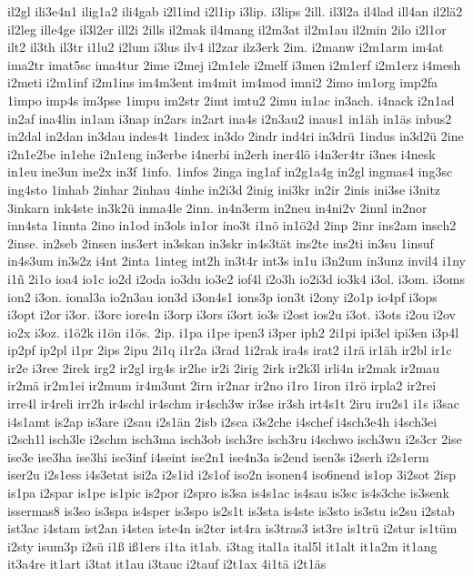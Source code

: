 {il2gl
ili3e4n1
ilig1a2
ili4gab
i2l1ind
i2l1ip
i3lip.
i3lips
2ill.
il3l2a
il4lad
ill4an
il2lä2
il2leg
ille4ge
il3l2er
ill2i
2ills
il2mak
il4mang
il2m3at
il2m1au
il2min
2ilo
i2l1or
ilt2
il3th
il3tr
i1lu2
i2lum
i3lus
ilv4
il2zar
ilz3erk
2im.
i2manw
i2m1arm
im4at
ima2tr
imat5sc
ima4tur
2ime
i2mej
i2m1ele
i2melf
i3men
i2m1erf
i2m1erz
i4mesh
i2meti
i2m1inf
i2m1ins
im4m3ent
im4mit
im4mod
imni2
2imo
im1org
imp2fa
1impo
imp4s
im3pse
1impu
im2str
2imt
imtu2
2imu
in1ac
in3ach.
i4nack
i2n1ad
in2af
ina4lin
in1am
i3nap
in2ars
in2art
ina4s
i2n3au2
inaus1
in1äh
in1äs
inbus2
in2dal
in2dan
in3dau
indes4t
1index
in3do
2indr
ind4ri
in3drü
1indus
in3d2ü
2ine
i2n1e2be
in1ehe
i2n1eng
in3erbe
i4nerbi
in2erh
iner4lö
i4n3er4tr
i3nes
i4nesk
in1eu
ine3un
ine2x
in3f
1info.
1infos
2inga
ing1af
in2g1a4g
in2gl
ingmas4
ing3sc
ing4sto
1inhab
2inhar
2inhau
4inhe
in2i3d
2inig
ini3kr
in2ir
2inis
ini3se
i3nitz
3inkarn
ink4ste
in3k2ü
inma4le
2inn.
in4n3erm
in2neu
in4ni2v
2innl
in2nor
inn4sta
1innta
2ino
in1od
in3ols
in1or
ino3t
i1nö
in1ö2d
2inp
2inr
ins2am
insch2
2inse.
in2seb
2insen
ins3ert
in3skan
in3skr
in4s3tät
ins2te
ins2ti
in3su
1insuf
in4s3um
in3s2z
i4nt
2inta
1integ
int2h
in3t4r
int3s
in1u
i3n2um
in3unz
invil4
i1ny
i1ñ
2i1o
ioa4
io1c
io2d
i2oda
io3du
io3e2
iof4l
i2o3h
io2i3d
io3k4
i3ol.
i3om.
i3oms
ion2
i3on.
ional3a
io2n3au
ion3d
i3on4s1
ions3p
ion3t
i2ony
i2o1p
io4pf
i3ops
i3opt
i2or
i3or.
i3orc
iore4n
i3orp
i3ors
i3ort
io3s
i2ost
ios2u
i3ot.
i3ots
i2ou
i2ov
io2x
i3oz.
i1ö2k
i1ön
i1ös.
2ip.
i1pa
i1pe
ipen3
i3per
iph2
2i1pi
ipi3el
ipi3en
i3p4l
ip2pf
ip2pl
i1pr
2ips
2ipu
2i1q
i1r2a
i3rad
1i2rak
ira4s
irat2
i1rä
ir1äh
ir2bl
ir1c
ir2e
i3ree
2irek
irg2
ir2gl
irg4s
ir2he
ir2i
2irig
2irk
ir2k3l
irli4n
ir2mak
ir2mau
ir2mä
ir2m1ei
ir2mum
ir4m3unt
2irn
ir2nar
ir2no
i1ro
1iron
i1rö
irpla2
ir2rei
irre4l
ir4reli
irr2h
ir4schl
ir4schm
ir4sch3w
ir3se
ir3sh
irt4s1t
2iru
iru2s1
i1s
i3sac
i4s1amt
is2ap
is3are
i2sau
i2s1än
2isb
i2sca
i3s2che
i4schef
i4sch3e4h
i4sch3ei
i2sch1l
isch3le
i2schm
isch3ma
isch3ob
isch3re
isch3ru
i4schwo
isch3wu
i2s3cr
2ise
ise3e
ise3ha
ise3hi
ise3inf
i4seint
ise2n1
ise4n3a
is2end
isen3s
i2serh
i2s1erm
iser2u
i2s1ess
i4s3etat
isi2a
i2s1id
i2s1of
iso2n
isonen4
iso6nend
is1op
3i2sot
2isp
is1pa
i2spar
is1pe
is1pic
is2por
i2spro
is3sa
is4s1ac
is4sau
is3sc
is4s3che
is3senk
issermas8
is3so
is3spa
is4sper
is3spo
is2s1t
is3sta
is4ste
is3sto
is3stu
is2su
i2stab
ist3ac
i4stam
ist2an
i4stea
iste4n
is2ter
ist4ra
is3tras3
ist3re
is1trü
i2stur
is1tüm
i2sty
isum3p
i2sü
i1ß
iß1ers
i1ta
it1ab.
i3tag
ital1a
ital5l
it1alt
it1a2m
it1ang
it3a4re
it1art
i3tat
it1au
i3tauc
i2tauf
i2t1ax
4i1tä
i2t1äs
}
